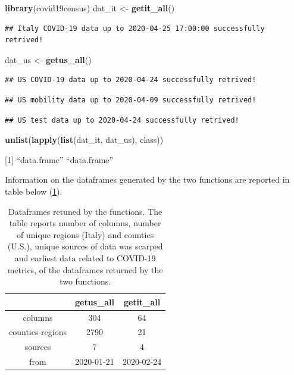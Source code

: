 \documentclass[12pt,halfline,a4paper,]{ouparticle}
\newenvironment{Shaded}{\begin{snugshade}}{\end{snugshade}}
\newcommand{\KeywordTok}[1]{\textcolor[rgb]{0.13,0.29,0.53}{\textbf{#1}}}
\newcommand{\NormalTok}[1]{#1}
\newcommand{\StringTok}[1]{\textcolor[rgb]{0.31,0.60,0.02}{#1}}
\begin{document}
\begin{Shaded}
\begin{Highlighting}[]
\KeywordTok{library}\NormalTok{(covid19census)}
\NormalTok{dat_it <-}\StringTok{ }\KeywordTok{getit_all}\NormalTok{()}
\end{Highlighting}
\end{Shaded}

\begin{verbatim}
## Italy COVID-19 data up to 2020-04-25 17:00:00 successfully retrived!
\end{verbatim}

\begin{Shaded}
\begin{Highlighting}[]
\NormalTok{dat_us <-}\StringTok{ }\KeywordTok{getus_all}\NormalTok{()}
\end{Highlighting}
\end{Shaded}

\begin{verbatim}
## US COVID-19 data up to 2020-04-24 successfully retrived!
\end{verbatim}

\begin{verbatim}
## US mobility data up to 2020-04-09 successfully retrived!
\end{verbatim}

\begin{verbatim}
## US test data up to 2020-04-24 successfully retrived!
\end{verbatim}

\begin{Shaded}
\begin{Highlighting}[]
\KeywordTok{unlist}\NormalTok{(}\KeywordTok{lapply}\NormalTok{(}\KeywordTok{list}\NormalTok{(dat_it, dat_us), class))}
\end{Highlighting}
\end{Shaded}

{[}1{]} ``data.frame'' ``data.frame''

\bigskip

Information on the dataframes generated by the two functions are
reported in table below (\ref{tab:tab_dat}).

\bigskip

\begin{table}[ht]
\centering
\begin{tabular}{ccc}
  \hline
 & getus\_all & getit\_all \\ 
  \hline
columns & 304 & 64 \\ 
  counties-regions & 2790 & 21 \\ 
  sources & 7 & 4 \\ 
  from & 2020-01-21 & 2020-02-24 \\ 
   \hline
\end{tabular}
\caption{Dataframes retuned by the functions.
    The table reports number of columns, number of unique regions (Italy) and counties (U.S.),
    unique sources of data was scarped and earliest data related to COVID-19 metrics, of the dataframes returned
    by the two functions.
    } 
\label{tab:tab_dat}
\end{table}
\end{document}
